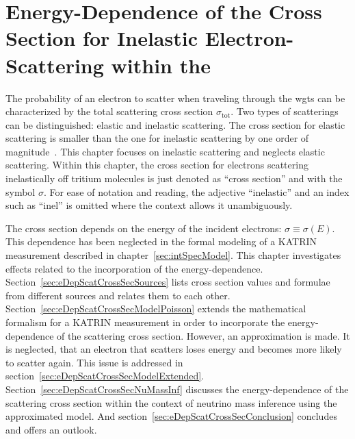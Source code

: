\def\currentRootFolder{chapter/energyDependentCrossSec}
\def\currentFigureFolder{\currentRootFolder/fig}


\chapter{Energy-Dependence of the Cross Section for Inelastic Electron-Scattering within the }
\label{sec:eDepScatCrossSec}
The probability of an electron to scatter when traveling through the \gls{wgts} can be characterized by the total scattering cross section $\sigma_\mathrm{tot}$. Two types of scatterings can be distinguished: elastic and inelastic scattering. The cross section for elastic scattering is smaller than the one for inelastic scattering by one order of magnitude~\cite{Kleesiek2019}. This chapter focuses on inelastic scattering and neglects elastic scattering. Within this chapter, the cross section for electrons scattering inelastically off tritium molecules is just denoted as ``cross section'' and with the symbol $\sigma$. For ease of notation and reading, the adjective ``inelastic'' and an index such as ``inel'' is omitted where the context allows it unambiguously.

The cross section depends on the energy of the incident electrons: $\sigma \equiv \sigma(E)$. This dependence has been neglected in the formal modeling of a KATRIN measurement described in chapter~\ref{sec:intSpecModel}. This chapter investigates effects related to the incorporation of the energy-dependence. Section~\ref{sec:eDepScatCrossSecSources} lists cross section values and formulae from different sources and relates them to each other. Section~\ref{sec:eDepScatCrossSecModelPoisson} extends the mathematical formalism for a KATRIN measurement in order to incorporate the energy-dependence of the scattering cross section. However, an approximation is made. It is neglected, that an electron that scatters loses energy and becomes more likely to scatter again. This issue is addressed in section~\ref{sec:eDepScatCrossSecModelExtended}. Section~\ref{sec:eDepScatCrossSecNuMassInf} discusses the energy-dependence of the scattering cross section within the context of neutrino mass inference using the approximated model. And section~\ref{sec:eDepScatCrossSecConclusion} concludes and offers an outlook.


